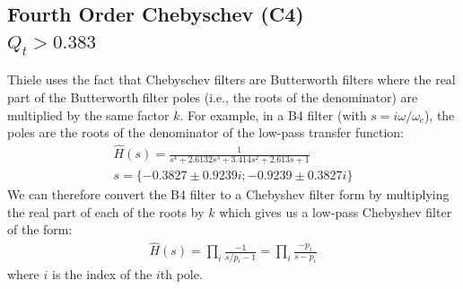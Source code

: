 \documentclass[10pt]{book}
\begin{document}
\subsection{Fourth Order Chebyschev (C4) \texorpdfstring{\\$Q_t>0.383$}{Qt>0.383}}
Thiele uses the fact that Chebyschev filters are Butterworth filters where the real part of the Butterworth filter poles (i.e., the roots of the denominator) are multiplied by the same factor $k$. For example, in a B4 filter (with $s=i\omega/\omega_c$), the poles are the roots of the denominator of the low-pass transfer function:
\begin{align}
\hat{H}(s)=\frac{1}{
s^4+2.6132s^3+3.414s^2+2.613s+1}\\
s=\{-0.3827\pm 0.9239i;-0.9239 \pm 0.3827i\}\label{eq:cheby_roots}
\end{align}
We can therefore convert the B4 filter to a Chebyshev filter form by multiplying the real part of each of the roots by $k$ which gives us a low-pass Chebyshev filter of the form:
\begin{align}
\hat{H}(s)= \prod_i \frac{-1}{ s/p_i-1 }= \prod_i  \frac{-p_i}{ s-p_i }
\end{align}
where $i$ is the index of the $i$th pole.
\end{document}
